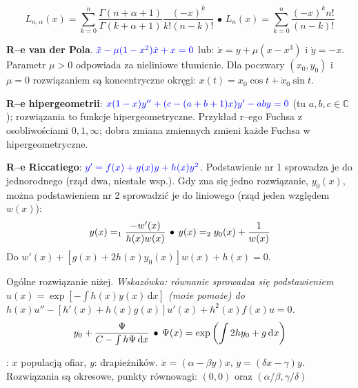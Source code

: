 \begin{multicols}{2}
\begin{enumx}
\[
	L_{n,\alpha}(x) = \sum_{k=0}^n \frac{\Gamma(n+\alpha+1)}{\Gamma(k+\alpha+1)} \frac{(-x)^k}{k!(n-k)!} \,\bullet\,
	L_n(x) = \sum_{k=0}^n \frac{(-x)^k n!}{(n-k)!}
\]
\item \textbf{R--e van der Pola}. $\color{blue}\ddot x - \mu(1-x^2) \dot x + x = 0$ lub: $\dot x = y + \mu(x-x^3)$ i $\dot y = -x$.
Parametr $\mu > 0$ odpowiada %
 za nieliniowe tłumienie.
Dla poczwary $(x_0, y_0)$ i $\mu = 0$ rozwiązaniem są koncentryczne okręgi: $x(t) = x_0 \cos t + \dot{x}_0 \sin t$.
\item \textbf{R--e hipergeometrii}: $\color{blue}x(1-x)y'' + (c-(a+b+1)x)y' -aby = 0$ (tu $a,b, c \in \mathbb C$);  rozwiązania to funkcje hipergeometryczne.
Przykład r--ego Fuchsa z osobliwościami $0, 1, \infty$; dobra zmiana zmiennych zmieni każde Fuchsa w hipergeometryczne.
\item \textbf{R--e Riccatiego}: $\color{blue}y' = f(x) + g(x)y + h(x)y^2$.
Podstawienie nr 1 sprowadza je do jednorodnego (rząd dwa, niestałe wsp.).
Gdy zna się jedno rozwiązanie, $y_0(x)$, można podstawieniem nr 2 sprowadzić je do liniowego (rząd jeden względem $w(x)$):
\[
	y(x) =_1 \frac{-w'(x)}{h(x)w(x)} \, \bullet \,
	y(x) =_2 y_0(x) + \frac{1}{w(x)}
\]
Do $w'(x) + [g(x) + 2h(x)y_0(x)] w(x) + h(x) = 0$.

Ogólne rozwiązanie niżej.
\emph{Wskazówka: równanie sprowadza się podstawieniem $u(x) = \exp [-\int h(x) y(x) \,\textrm{d} x ]$ (może pomoże) do $h(x) u'' - [h'(x)+h(x)g(x)]u'(x) + h^2(x)f(x)u = 0$.}
\[ 
y_0 + \frac{\Psi}{C -\int h \Psi \,\textrm{d} x} \, \bullet \,
	\Psi(x) = \exp \left(\int 2 hy_0+ g \,\textrm{d} x\right)
\]
\item {}: $x$ populacją ofiar, $y$: drapieżników.
$\dot x = (\alpha - \beta y) x$, $\dot y = (\delta x  - \gamma) y$.
Rozwiązania są okresowe, punkty równowagi: $(0, 0)$ oraz $(\alpha / \beta, \gamma/\delta)$
\end{enumx}

\end{multicols}